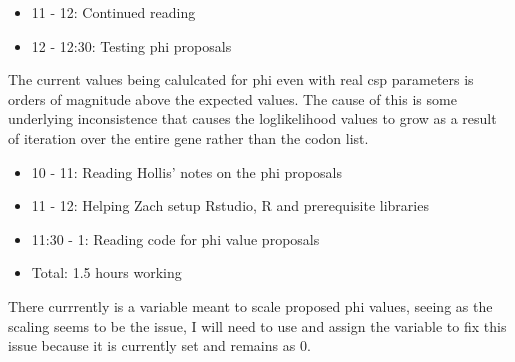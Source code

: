 \documentclass[12pt,hyperref]{labbook}
\begin{document}
\begin{itemize}
    \item 11 - 12: Continued reading
    \item 12 - 12:30: Testing phi proposals
\end{itemize}
The current values being calulcated for phi even with real csp parameters is orders of magnitude above the
expected values. The cause of this is some underlying inconsistence that causes the loglikelihood values
to grow as a result of iteration over the entire gene rather than the codon list.
\begin{itemize}
    \item 10 - 11: Reading Hollis' notes on the phi proposals
    \item 11 - 12: Helping Zach setup Rstudio, R and prerequisite libraries
\end{itemize}
\begin{itemize}
    \item 11:30 - 1: Reading code for phi value proposals
    \item Total: 1.5 hours working
\end{itemize}
There currrently is a variable meant to scale proposed phi values, seeing as the scaling seems to be the issue,
I will need to use and assign the variable to fix this issue because it is currently set and remains as 0. 
\end{document}
